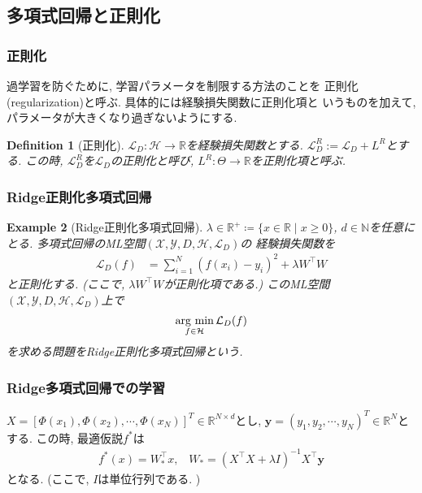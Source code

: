\documentclass[dvipdfmx,11pt]{beamer}		%
\newtheorem{defi}{Definition}
\newtheorem{exam}[defi]{Example}
\newcommand{\N}{\mathbb{N}}
\newcommand{\R}{\mathbb{R}}
\newcommand{\X}{\mathcal{X}}
\newcommand{\Y}{\mathcal{Y}}
\newcommand{\Hil}{\mathcal{H}}
\newcommand{\Loss}{\mathcal{L}_{D}}
\newcommand{\MLsp}{(\X, \Y, D, \Hil, \Loss)}
\newcommand{\argmin}{\mathop{\rm arg~min}\limits}
\begin{document}
    \subsection{多項式回帰と正則化}
    \begin{frame}
        \frametitle{正則化}
        過学習を防ぐために, 学習パラメータを制限する方法のことを
        正則化(regularization)と呼ぶ. 具体的には経験損失関数に正則化項と
        いうものを加えて, パラメータが大きくなり過ぎないようにする. 
        \begin{defi}[正則化]
            $\Loss:\Hil\to\R$を経験損失関数とする. $\Loss^{R} := \Loss + L^{R}$とする.
            この時, $\Loss^{R}$を$\Loss$の正則化と呼び, $L^R:\Theta\to\R$を正則化項と呼ぶ.
        \end{defi}
    \end{frame}
    \begin{frame}
        \frametitle{Ridge正則化多項式回帰}
        \begin{exam}[Ridge正則化多項式回帰]
            $\lambda\in\R^{+}\coloneqq\{x\in\R\mid x\geq0\}$, $d\in\N$を任意にとる. 多項式回帰のML空間$\MLsp$の
            経験損失関数を
            \begin{align*}
                \Loss(f) &= \sum_{i = 1}^{N}(f(x_i) - y_i)^2 + \lambda W^\top W
            \end{align*}
            と正則化する. (ここで, $\lambda W^{\top}W$が正則化項である.) 
            このML空間$\MLsp$上で
            \begin{align*}
                \argmin_{f\in\Hil}\Loss(f)
            \end{align*}
            を求める問題をRidge正則化多項式回帰という. 
        \end{exam}
    \end{frame}
    \begin{frame}
        \frametitle{Ridge多項式回帰での学習}
            $X = [\Phi(x_1), \Phi(x_{2}), \cdots, \Phi(x_N)]^{T}\in\R^{N\times d}$とし, 
            $\mathbf{y} = (y_{1}, y_{2}, \cdots, y_{N})^{T}\in\R^{N}$とする. この時, 最適仮説$f^{*}$は
            \begin{align*}
                f^{*}(x) = W_*^{\top}x, \hspace{10pt} W_* = (X^\top X + \lambda I)^{-1}X^\top\mathbf{y}
            \end{align*}
            となる. (ここで, $I$は単位行列である. )
    \end{frame}
\end{document}
